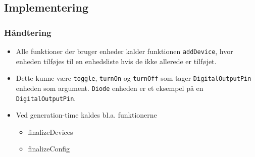 \documentclass[t]{beamer}
\begin{document}
\subsection{Implementering}

\begin{frame}
  \frametitle{Håndtering}
  
  \begin{itemize}
  \item Alle funktioner der bruger enheder kalder funktionen \texttt{addDevice},
    hvor enheden tilføjes til en enhedsliste hvis de ikke allerede er tilføjet.
    
  \item Dette kunne være \texttt{toggle}, \texttt{turnOn} og \texttt{turnOff}
    som tager \texttt{DigitalOutputPin} enheden som argument. \texttt{Diode}
    enheden er et eksempel på en \texttt{DigitalOutputPin}.
    
  \item Ved generation-time kaldes bl.a. funktionerne
    \begin{itemize}
    \item finalizeDevices
    \item finalizeConfig
    \end{itemize}
  \end{itemize}
\end{frame}
\end{document}
